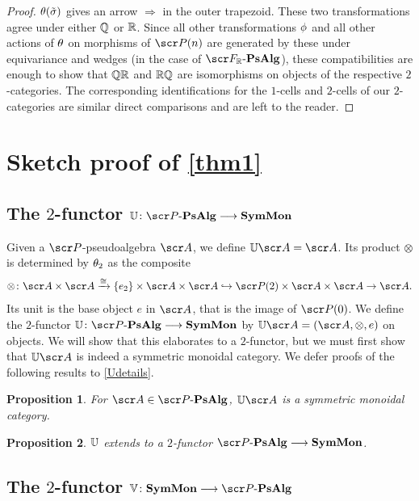 \documentclass{amsart}
\newtheorem{prop}{Proposition}[section]
\theoremstyle{definition}
\numberwithin{equation}{section}
\newcommand{\PPs}{\sP\text{-}\mathbf{PsAlg}}
\newcommand{\FPR}{\sF_{\bR}\text{-}\mathbf{PsAlg}}
\newcommand{\SM}{\mathbf{SymMon}}
\begin{document}
\begin{proof}
 $\theta(\tilde{\sigma})$ gives an arrow $\Rightarrow$ in the outer trapezoid.  These two transformations agree under either  $\mathbb{Q}$ or $\mathbb{R}$.  Since all other transformations $\phi$ and all other actions of $\theta$ on morphisms of $\sP(n)$ are generated by these under equivariance  and wedges (in the case of $\FPR$), these compatibilities are enough to show that $\mathbb{Q}\mathbb{R}$ and $\mathbb{R}\mathbb{Q}$ are isomorphisms on objects of the respective $2$-categories.  The corresponding identifications for the $1$-cells and $2$-cells of our $2$-categories are similar direct comparisons and are left to the reader. \end{proof}
   
\section{Sketch proof of \autoref{thm1}}\label{Sec3}

\subsection{The $2$-functor $\bU\colon \PPs \rtarr \SM$}\label{U}

Given a $\sP$-pseudoalgebra $\sA$, we define $\bU \sA = \sA$.  Its product $\otimes$ is determined by $\theta_2$ as the composite
\[\otimes \colon \sA\times \sA\xrightarrow{\cong} \{e_2\}\times \sA\times \sA\hookrightarrow \sP(2)\times \sA\times \sA\rightarrow \sA.\]
Its unit is the base object $e$ in $\sA$, that is the image of $\sP(0)$. We define the $2$-functor $\bU \colon \PPs \rtarr \SM$
by  $\bU \sA=(\sA,\otimes,e)$ on objects.  We will show that this elaborates to a $2$-functor, but we must first show that $\bU \sA$ is indeed a symmetric monoidal category.  We defer 
 proofs of the following results to \autoref{Udetails}.

\begin{prop}  For $\sA\in \PPs$, $\bU \sA$ is a symmetric monoidal category. \label{UProp1}
\end{prop}

\begin{prop} $\mathbb{U}$ extends to a $2$-functor  $\PPs \rtarr \SM$. \label{UProp2} 
\end{prop}

\subsection{The $2$-functor $\bV\colon \SM \rtarr \PPs$}\label{V}
\end{document}
